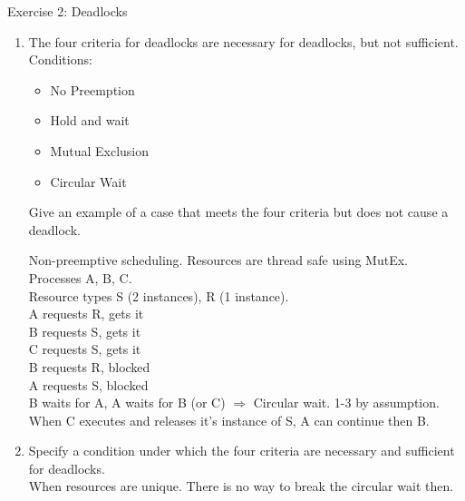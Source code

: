 \documentclass[10pt]{beamer}
\begin{document}
        \begin{frame}[allowframebreaks]{Exercise 2: Deadlocks}
            \begin{enumerate}
                \item The four criteria for deadlocks are {necessary} for deadlocks, but not {sufficient}. \\
                    Conditions:
                    \begin{itemize}
                        \item No Preemption
                        \item Hold and wait
                        \item Mutual Exclusion
                        \item Circular Wait
                    \end{itemize}
                    Give an example of a case that meets the four criteria but does not cause a deadlock. \\
                    \framebreak

                    \alert{Non-preemptive scheduling. Resources are thread safe using MutEx.\\
                    Processes A, B, C. \\
                    Resource types S (2 instances), R (1 instance). \\
                    A requests R, gets it \\
                    B requests S, gets it \\
                    C requests S, gets it \\
                    B requests R, blocked \\
                    A requests S, blocked \\
                    B waits for A, A waits for B (or C) $\Rightarrow$ Circular wait. 1-3 by assumption. \\
                    When C executes and releases it's instance of S, A can continue then B.}

                \item Specify a condition under which the four criteria are necessary and sufficient for deadlocks. \\
                    \alert{When resources are unique. There is no way to break the circular wait then.}
            \end{enumerate}
        \end{frame}
\end{document}
